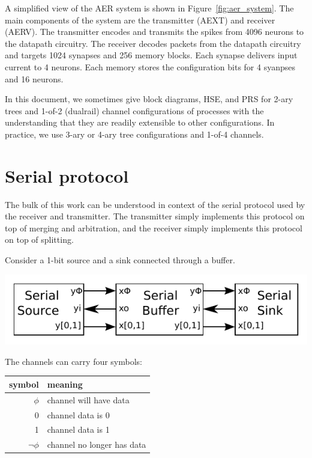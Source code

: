\documentclass{article}
\begin{document}
A simplified view of the AER system is shown in Figure~\ref{fig:aer_system}.
The main components of the system are the transmitter (AEXT) and receiver (AERV).
The transmitter encodes and transmits the spikes from 4096 neurons to the 
datapath circuitry. The receiver decodes packets from the datapath circuitry 
and targets 1024 synapses and 256 memory blocks. Each synapse delivers input 
current to 4 neurons. Each memory stores the configuration bits for 4 syanpses 
and 16 neurons.

In this document, we sometimes give block diagrams, HSE, and PRS for 2-ary 
trees and 1-of-2 (dualrail) channel configurations of processes with the 
understanding that they are readily extensible to other configurations.
In practice, we use 3-ary or 4-ary tree configurations and 1-of-4 channels.

\section{Serial protocol}

The bulk of this work can be understood in context of the serial protocol
used by the receiver and transmitter. 
The transmitter simply implements this protocol on top of merging and arbitration, 
and the receiver simply implements this protocol on top of splitting.

Consider a 1-bit source and a sink connected through a buffer.

\begin{center}
    \includegraphics[width=.5\textwidth]{img/serial_protocol_block_diagram.pdf}
\end{center}

\noindent
The channels can carry four symbols:

\begin{center}
    \begin{tabular}{r|l}
    \hline
    symbol & meaning \\ \hline
    $\phi$ & channel will have data \\
    0 & channel data is 0 \\
    1 & channel data is 1 \\
    $\neg\phi$ & channel no longer has data \\
    \hline
    \end{tabular}
\end{center}
\end{document}
